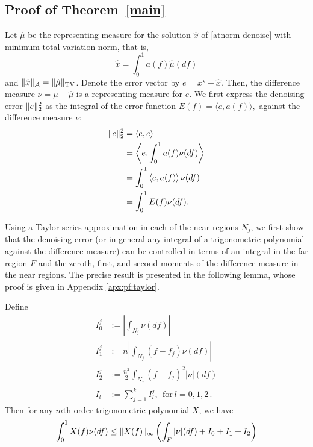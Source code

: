 \subsection{Proof of Theorem~\ref{main}}
Let $\hat{\mu}$ be the representing measure for the solution $\hat{x}$  of \eqref{atnorm-denoise} with minimum total variation norm, that is,
\[
\hat{x} = \int_0^1 a(f) \hat{\mu}(df)
\]
and $\lVert\hat{x}\rVert_{\mathcal{A}} = \lVert\hat{\mu}\rVert_{\mathrm{TV}}$. Denote the error vector by $e = x^\star - \hat{x}$. 
Then, the difference measure $\nu = \mu - \hat{\mu}$ is a representing measure for $e$. We first express the denoising error $\lVert e\rVert_2^2$ as the integral of the error function $E(f) = \langle e, a(f) \rangle,$ against the difference measure $\nu$:
\begin{align*}
\lVert e\rVert_2^2 &= \langle e, e \rangle\\
& = \left\langle e, \int_0^1 a(f) \nu(df) \right\rangle\\
& =  \int_0^1  \left\langle e,a(f) \right\rangle \nu(df)\\
& = \int_0^1 E(f) \nu(df).
\end{align*}


Using a Taylor series approximation in each of 
the near regions $N_j$, we first show that the denoising error (or in general any 
integral of a trigonometric polynomial against the difference measure) can be controlled in terms 
of an integral in the far region $F$ and the zeroth, first, and second 
moments of the difference measure in the near regions.  The precise result is presented in the following lemma, whose proof is given in Appendix \ref{apx:pf:taylor}.
\begin{lemma}
\label{part1}
Define
\begin{align*} 
I_0^j &:= \left| \int_{N_j} \nu(df) \right|\\
I_1^j &:= n \left| \int_{N_j} (f-f_j) \nu(df) \right|\\
I_2^j &:= \frac{n^2}{2} \int_{N_j} (f-f_j)^2 |\nu|(df)\\
I_l &:= \sum_{j=1}^k I_l^j,~~\mbox{for}~l = 0, 1, 2\,.
\end{align*}
Then for any $m$th order trigonometric polynomial $X$, we have
\[
\int_0^1{ X(f) \nu(df)}
\leq \lVert X(f)\rVert_\infty \left(\int_F{|\nu|(df)} + I_0 + I_1 + I_2\right)
\]
\end{lemma}

